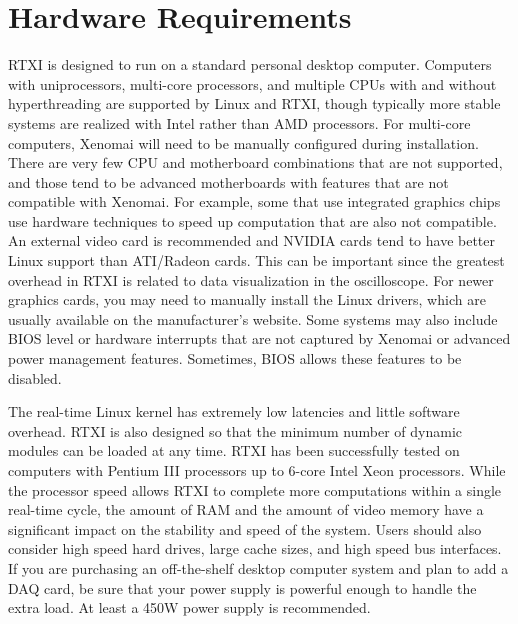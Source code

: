 \section{Hardware Requirements}

 
RTXI is designed to run on a standard personal desktop computer. Computers with uniprocessors, multi-core processors, and multiple CPUs with and without hyperthreading are supported by Linux and RTXI, though typically more stable systems are realized with Intel rather than AMD processors. For multi-core computers, Xenomai will need to be manually configured during installation. There are very few CPU and motherboard combinations that are not supported, and those tend to be advanced motherboards with features that are not compatible with Xenomai. For example, some that use integrated graphics chips use hardware techniques to speed up computation that are also not compatible. An external video card is recommended and NVIDIA cards tend to have better Linux support than ATI/Radeon cards. This can be important since the greatest overhead in RTXI is related to data visualization in the oscilloscope. For newer graphics cards, you may need to manually install the Linux drivers, which are usually available on the manufacturer's website. Some systems may also include BIOS level or hardware interrupts that are not captured by Xenomai or advanced power management features. Sometimes, BIOS allows these features to be disabled.

The real-time Linux kernel has extremely low latencies and little software overhead. RTXI is also designed so that the minimum number of dynamic modules can be loaded at any time. RTXI has been successfully tested on computers with Pentium III processors up to 6-core Intel Xeon processors. While the processor speed allows RTXI to complete more computations within a single real-time cycle, the amount of RAM and the amount of video memory have a significant impact on the stability and speed of the system. Users should also consider high speed hard drives, large cache sizes, and high speed bus interfaces. If you are purchasing an off-the-shelf desktop computer system and plan to add a DAQ card, be sure that your power supply is powerful enough to handle the extra load. At least a 450W power supply is recommended. 